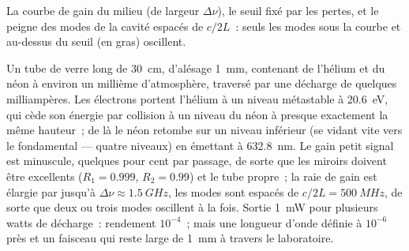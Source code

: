 \begin{omfigure}

{\small La courbe de gain du milieu (de largeur $\Delta\nu$), le seuil
fixé par les pertes, et le peigne des modes de la cavité espacés de $c/2L$~: seuls les
modes sous la courbe et au-dessus du seuil (en gras) oscillent.}
\end{omfigure}

\begin{example}\label{ex:b2:laser:hene}
Un tube de verre long de \qty{30}{cm}, d'alésage \qty{1}{mm}, contenant de l'hélium et du
néon à environ un millième d'atmosphère, traversé par une décharge de
quelques milliampères. Les électrons portent l'hélium à un niveau métastable à
\qty{20.6}{eV}, qui cède son énergie par collision à un niveau du néon à
presque exactement la même hauteur~; de là le néon retombe sur un niveau inférieur
(se vidant vite vers le fondamental --- quatre niveaux) en émettant à
\qty{632.8}{nm}. Le gain petit signal est minuscule, quelques pour cent par
passage, de sorte que les miroirs doivent être excellents ($R_1 = 0.999$, $R_2 = 0.99$)
et le tube propre~; la raie de gain est élargie par  jusqu'à
$\Delta\nu \approx \qty{1.5}{GHz}$, les modes sont espacés de $c/2L = \qty{500}{MHz}$,
de sorte que deux ou trois modes oscillent à la fois. Sortie \qty{1}{mW} pour
plusieurs watts de décharge~: rendement $10^{-4}$~; mais une longueur d'onde
définie à $10^{-6}$ près et un faisceau qui reste large de \qty{1}{mm} à travers le
laboratoire.
\end{example}

